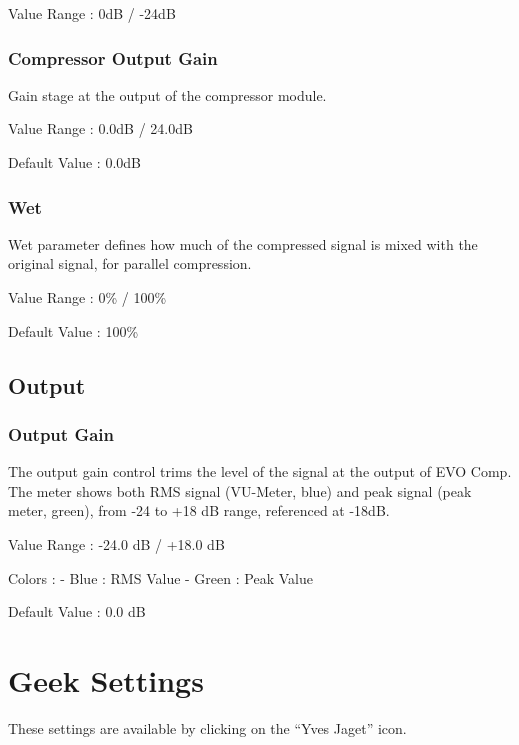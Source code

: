\documentclass[
  letterpaper,
  DIV=11,
  numbers=noendperiod]{scrreport}
\begin{document}
Value Range : 0dB / -24dB

\hypertarget{compressor-output-gain}{%
\subsection{Compressor Output Gain}\label{compressor-output-gain}}

Gain stage at the output of the compressor module.

Value Range : 0.0dB / 24.0dB

Default Value : 0.0dB

\hypertarget{wet}{%
\subsection{Wet}\label{wet}}

Wet parameter defines how much of the compressed signal is mixed with
the original signal, for parallel compression.

Value Range : 0\% / 100\%

Default Value : 100\%

\hypertarget{output}{%
\section{Output}\label{output}}

\hypertarget{output-gain}{%
\subsection{Output Gain}\label{output-gain}}

The output gain control trims the level of the signal at the output of
EVO Comp. The meter shows both RMS signal (VU-Meter, blue) and peak
signal (peak meter, green), from -24 to +18 dB range, referenced at
-18dB.

Value Range : -24.0 dB / +18.0 dB

Colors : - Blue : RMS Value - Green : Peak Value

Default Value : 0.0 dB


\hypertarget{geek-settings}{%
\chapter{Geek Settings}\label{geek-settings}}

These settings are available by clicking on the ``Yves Jaget'' icon.
\end{document}
